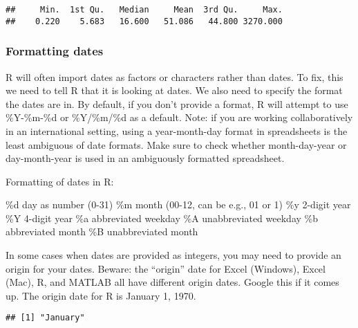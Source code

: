 \documentclass[]{article}
\newenvironment{Shaded}{\begin{snugshade}}{\end{snugshade}}
\newcommand{\CommentTok}[1]{\textcolor[rgb]{0.56,0.35,0.01}{\textit{#1}}}
\newcommand{\DataTypeTok}[1]{\textcolor[rgb]{0.13,0.29,0.53}{#1}}
\newcommand{\KeywordTok}[1]{\textcolor[rgb]{0.13,0.29,0.53}{\textbf{#1}}}
\newcommand{\NormalTok}[1]{#1}
\newcommand{\StringTok}[1]{\textcolor[rgb]{0.31,0.60,0.02}{#1}}
\begin{document}
\begin{verbatim}
##     Min.  1st Qu.   Median     Mean  3rd Qu.     Max. 
##    0.220    5.683   16.600   51.086   44.800 3270.000
\end{verbatim}

\hypertarget{formatting-dates}{%
\subsubsection{Formatting dates}\label{formatting-dates}}

R will often import dates as factors or characters rather than dates. To
fix, this we need to tell R that it is looking at dates. We also need to
specify the format the dates are in. By default, if you don't provide a
format, R will attempt to use \%Y-\%m-\%d or \%Y/\%m/\%d as a default.
Note: if you are working collaboratively in an international setting,
using a year-month-day format in spreadsheets is the least ambiguous of
date formats. Make sure to check whether month-day-year or
day-month-year is used in an ambiguously formatted spreadsheet.

Formatting of dates in R:

\%d day as number (0-31) \%m month (00-12, can be e.g., 01 or 1) \%y
2-digit year \%Y 4-digit year \%a abbreviated weekday \%A unabbreviated
weekday \%b abbreviated month \%B unabbreviated month

In some cases when dates are provided as integers, you may need to
provide an origin for your dates. Beware: the ``origin'' date for Excel
(Windows), Excel (Mac), R, and MATLAB all have different origin dates.
Google this if it comes up. The origin date for R is January 1, 1970.

\begin{Shaded}
\end{Shaded}

\begin{verbatim}
## [1] "January"
\end{verbatim}
\end{document}
